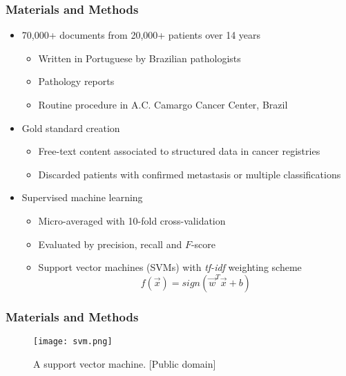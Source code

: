 

\begin{frame}
	\frametitle{Materials and Methods}
	\begin{itemize} \myspacing
		\item 70,000+ documents from 20,000+ patients over 14 years
		\begin{itemize}
			\item Written in Portuguese by Brazilian pathologists
			\item Pathology reports        
                         \item Routine procedure in A.C. Camargo Cancer Center, Brazil
                \end{itemize}
                 \item Gold standard creation
                \begin{itemize}
                		\item Free-text content associated to structured data in cancer registries
			\item Discarded patients with confirmed metastasis or multiple classifications
                \end{itemize}
                \item Supervised machine learning
                \begin{itemize}
			\item Micro-averaged with 10-fold cross-validation
			\item Evaluated by precision, recall and $F$-score
			\item Support vector machines (SVMs) with \emph{tf-idf} weighting scheme
			\begin{equation}
				\label{eq:svm}
				f(\vec{x}) = sign(\vec{w}^T\vec{x} + b)
			\end{equation}
                \end{itemize}

	\end{itemize}
\end{frame}

\begin{frame}
	\frametitle{Materials and Methods}
                \begin{figure}
        			\centering
        			\texttt{[image: svm.png]}
        			\caption{A support vector machine. [Public domain]}
        			\label{fig:}
  		\end{figure}
\end{frame}



